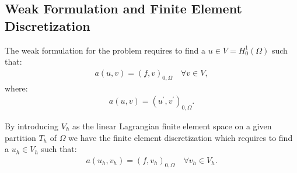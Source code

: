 \subsection{Weak Formulation and Finite Element Discretization} \label{fem_definition}

The weak formulation for the problem requires to find a $u \in V = H_0^1(\Omega)$ such that:
\begin{gather}
	a(u, v) = (f, v)_{0, \Omega} \quad \forall v \in V,
\end{gather}
where:
\begin{gather}
	a(u, v) = (u^{\prime}, v^{\prime})_{0, \Omega}.
\end{gather}

By introducing $V_h$ as the linear Lagrangian finite element space on a given partition $T_h$ of $\Omega$ we have the finite element discretization which requires to find a $u_h \in V_h$ such that:
\begin{gather}
	a(u_h, v_h) = (f, v_h)_{0, \Omega} \quad \forall v_h \in V_h.
\end{gather}